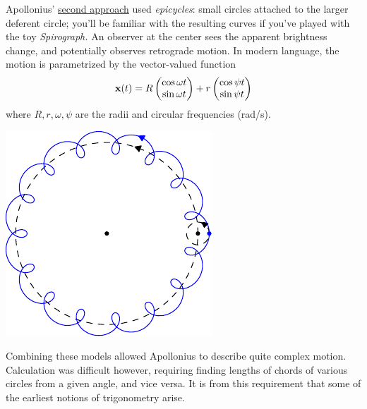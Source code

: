 \begin{minipage}[t]{0.68\linewidth}\vspace{0pt}
	Apollonius' \href{http://brunelleschi.imss.fi.it/galileopalazzostrozzi/multimedia/ApolloniusEpicycles.html}{second approach} used \emph{epicycles}: small circles attached to the larger deferent circle; you'll be familiar with the resulting curves if you've played with the toy \emph{Spirograph.} An observer at the center sees the apparent brightness change, and potentially observes retrograde motion. In modern language, the motion is parametrized by the vector-valued function
	\[
		{\mathbf{x}}(t)=R\begin{pmatrix}\cos \omega t\\\sin \omega t\end{pmatrix}+r\begin{pmatrix}\cos \psi t\\\sin \psi t\end{pmatrix}
	\]
	where $R,r,\omega,\psi$ are the radii and circular frequencies (rad/s).
\end{minipage}
\hfill
\begin{minipage}[t]{0.31\linewidth}\vspace{0pt}
  \flushright\includegraphics{trig-epicycle1}
\end{minipage}
\medbreak
  
Combining these models allowed Apollonius to describe quite complex motion. Calculation was difficult however, requiring finding lengths of chords of various circles from a given angle, and vice versa. It is from this requirement that some of the earliest notions of trigonometry arise.\smallbreak
 
